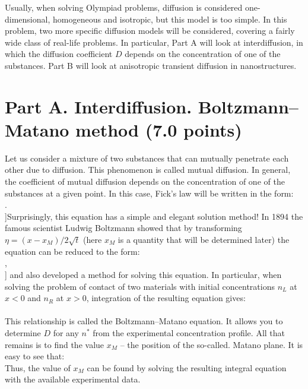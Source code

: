 \documentclass[11pt,a4paper]{article}
\begin{document}
Usually, when solving Olympiad problems, diffusion is considered one-dimensional, homogeneous and isotropic, but this model is too simple. In this problem, two more specific diffusion models will be considered, covering a fairly wide class of real-life problems. In particular, Part A will look at interdiffusion, in which the diffusion coefficient $D$ depends on the concentration of one of the substances. Part B will look at anisotropic transient diffusion in nanostructures.

\section*{Part A. Interdiffusion. Boltzmann–Matano method (7.0 points)}

Let us consider a mixture of two substances that can mutually penetrate each other due to diffusion. This phenomenon is called mutual diffusion. In general, the coefficient of mutual diffusion depends on the concentration of one of the substances at a given point. In this case, Fick's law will be written in the form: \\[\frac\{\partial\}\{\partial t\}n=\frac\{\partial\}\{\partial x\}\left[D(n)\frac\{\partial n\}\{\partial x\}\right].\\]Surprisingly, this equation has a simple and elegant solution method! In 1894 the famous scientist Ludwig Boltzmann showed that by transforming $\eta=(x-x_M)/2\sqrt t$ (here $x_M$ is a quantity that will be determined later) the equation can be reduced to the form: \\[-2\eta\frac\{\mathrm dn\}\{\mathrm d\eta\}=\frac\{\mathrm d\}\{\mathrm d\eta\}\left[D(n)\frac\{\mathrm dn\}\{\mathrm d\eta\}\right],\\] and also developed a method for solving this equation. In particular, when solving the problem of contact of two materials with initial concentrations $n_L$ at $x < 0$ and $n_R$ at $x > 0$, integration of the resulting equation gives: \\[-2\int\limits_\{n_L\}^\{n^*\}\eta~\mathrm dn=D(n^*)\cdot(\mathrm dn\{/\}\mathrm d\eta)|_\{n^*\}-D(n_L)\cdot(\mathrm dn\{/\}\mathrm d\eta)|_\{n_L\}\implies D(n^*)=-\frac2\{(\mathrm dn\{/\}\mathrm dx)|_\{n=n^*\}\}\int\limits_\{n_L\}^\{n^*\}\eta~\mathrm dn\\]\\[\implies D(n^*)=-\frac1\{2t(\mathrm dn\{/\}\mathrm dx)|_\{n^*\}\}\int\limits_\{n_L\}^\{n^*\}(x-x_M)~\mathrm dn.\\]This relationship is called the Boltzmann–Matano equation. It allows you to determine $D$ for any $n^*$ from the experimental concentration profile. All that remains is to find the value $x_M$ – the position of the so-called. Matano plane. It is easy to see that:\\[\int\limits_\{n_L\}^\{n_R\}\eta~\mathrm dn=0\implies\int\limits_\{n_L\}^\{n(x_M)\}(x-x_M)~\mathrm dn+\int\limits_\{n(x_M)\}^\{n_R\}(x-x_M)~\mathrm dn=0.\\]Thus, the value of $x_M$ can be found by solving the resulting integral equation with the available experimental data.
\end{document}
